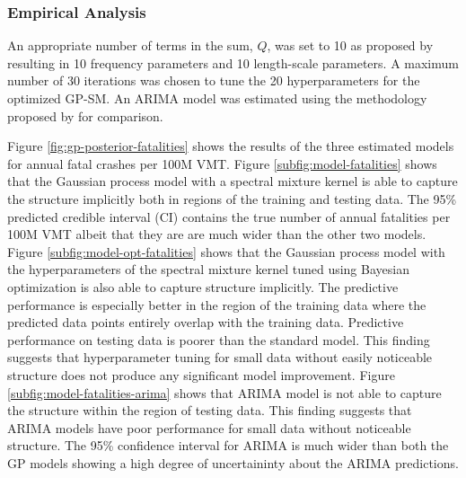 \documentclass[letterpaper]{article}
\begin{document}

\subsubsection{Empirical Analysis}

An appropriate number of terms in the sum, $Q$, was set to 10 as proposed by \cite{wilson2015human} resulting in 10 frequency parameters and 10 length-scale parameters. A maximum number of 30 iterations was chosen to tune the 20 hyperparameters for the optimized GP-SM. An ARIMA model was estimated using the methodology proposed by \cite{veeramisti2016business} for comparison.

Figure \ref{fig:gp-posterior-fatalities} shows the results of the three estimated models for annual fatal crashes per 100M VMT. Figure \ref{subfig:model-fatalities} shows that the Gaussian process model with a spectral mixture kernel is able to capture the structure implicitly both in regions of the training and testing data. The 95\% predicted credible interval (CI) contains the true number of annual fatalities per 100M VMT albeit that they are are much wider than the other two models. Figure \ref{subfig:model-opt-fatalities} shows that the Gaussian process model with the hyperparameters of the spectral mixture kernel tuned using Bayesian optimization is also able to capture structure implicitly. The predictive performance is especially better in the region of the training data where the predicted data points entirely overlap with the training data. Predictive performance on testing data is poorer than the standard model. This finding suggests that hyperparameter tuning for small data without easily noticeable structure does not produce any significant model improvement. Figure \ref{subfig:model-fatalities-arima} shows that ARIMA model is not able to capture the structure within the region of testing data. This finding suggests that ARIMA models have poor performance for small data without noticeable structure. The 95\% confidence interval for ARIMA is much wider than both the GP models showing a high degree of uncertaininty about the ARIMA predictions.
\end{document}
